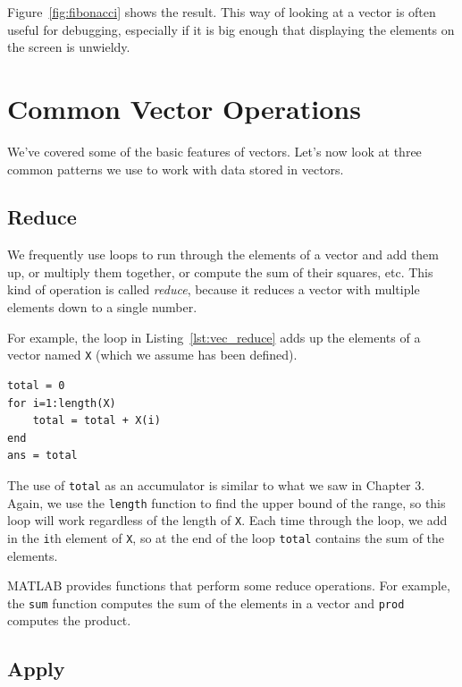 Figure~\ref{fig:fibonacci} shows the result.
This way of looking at a vector is often useful for debugging, especially
if it is big enough that displaying the elements on
the screen is unwieldy.


\section{Common Vector Operations}

We've covered some of the basic features of vectors. Let's now look at three common patterns we use to work with data stored in vectors.

\subsection{Reduce}
\label{reduce}

We frequently use loops to run through the elements of a vector
and add them up, or multiply them together, or compute the sum
of their squares, etc.  This kind of operation is called \emph{reduce},
because it reduces a vector with multiple elements down to a single
number.


For example, the loop in Listing~\ref{lst:vec_reduce} adds up the elements of a vector named {\tt X} (which we assume has been defined).

\begin{lstlisting}[caption={Reducing a vector to a single scalar value (the sum)}, label={lst:vec_reduce}]
total = 0
for i=1:length(X)
    total = total + X(i)
end
ans = total
\end{lstlisting}

The use of {\tt total} as an accumulator is similar to what we
saw in Chapter 3.  Again, we use the {\tt length} function
to find the upper bound of the range, so this loop will work
regardless of the length of {\tt X}.
Each time through the loop, we add
in the {\tt i}th element of {\tt X}, so at the end of the loop
{\tt total} contains the sum of the elements.


MATLAB provides functions that perform some reduce operations.
For example, the {\tt sum} function computes the sum of the elements
in a vector and {\tt prod} computes the product.


\subsection{Apply}
\label{apply}

